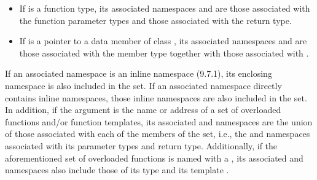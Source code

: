 \begin{std.txt}
\begin{itemize}
  \item If  is a function type, its associated
  namespaces and   are those
  associated with the function parameter types and those associated
  with the return type.

  \item If  is a pointer to a data member of
  class , its associated namespaces
  and   are those associated with the
  member type together with those associated with .
  \end{itemize}

  If an associated namespace is an inline namespace (9.7.1), its
  enclosing namespace is also included in the set.  If an associated
  namespace directly contains inline namespaces, those inline
  namespaces are also included in the set.  In addition, if the
  argument is the name or address of a set of overloaded functions
  and/or function templates, its
  associated   and namespaces are the
  union of those associated with each of the members of the set, i.e.,
  the   and namespaces associated
  with its parameter types and return type.  Additionally, if the
  aforementioned set of overloaded functions is named with
  a , its
  associated   and namespaces also
  include those of its type  and its
  template .
\end{std.txt}


